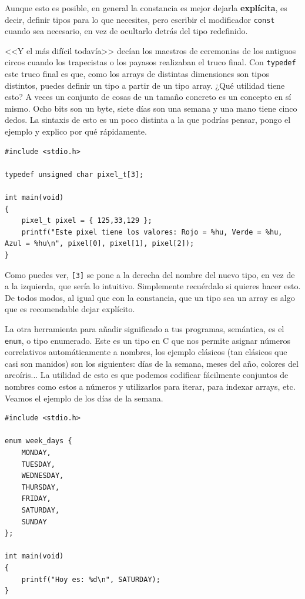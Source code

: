 \documentclass[a4paper]{article}
\begin{document}
Aunque esto es posible, en general la constancia es mejor dejarla
\textbf{explícita}, es decir, definir tipos para lo que necesites, pero
escribir el modificador \verb!const! cuando sea necesario, en vez de ocultarlo
detrás del tipo redefinido.

<<Y el más difícil todavía>> decían los maestros de ceremonias de los antiguos
circos cuando los trapecistas o los payasos realizaban el truco final. Con
\verb!typedef! este truco final es que, como los arrays de distintas dimensiones
son tipos distintos, puedes definir un tipo a partir de un tipo array. ¿Qué
utilidad tiene esto? A veces un conjunto de cosas de un tamaño concreto es un
concepto en sí mismo. Ocho bits son un byte, siete días son una
semana y una mano tiene cinco dedos. La sintaxis de esto es un poco distinta a
la que podrías pensar, pongo el ejemplo y explico por qué rápidamente.


\noindent
\begin{minipage}[H]{\linewidth}
\mbox{}
\begin{lstlisting}[style=C,
caption={Definición de un tipo personalizado a partir de un array},
label={lst:typedefArrayType}]
#include <stdio.h>

typedef unsigned char pixel_t[3];

int main(void)
{
    pixel_t pixel = { 125,33,129 };
    printf("Este pixel tiene los valores: Rojo = %hu, Verde = %hu, Azul = %hu\n", pixel[0], pixel[1], pixel[2]);
}
\end{lstlisting}
\end{minipage}

Como puedes ver, \verb![3]! se pone a la derecha del nombre del nuevo tipo, en
vez de a la izquierda, que sería lo intuitivo. Simplemente recuérdalo si quieres
hacer esto. De todos modos, al igual que con la constancia, que un tipo sea
un array es algo que es recomendable dejar explícito.

La otra herramienta para añadir significado a tus programas, semántica, es
el \verb!enum!, o tipo enumerado. Este es un tipo en C que nos permite asignar
números correlativos automáticamente a nombres, los ejemplo clásicos (tan
clásicos que casi son manidos) son los siguientes: días de la semana,
meses del año, colores del arcoíris... La utilidad de esto es que podemos
codificar fácilmente conjuntos de nombres como estos a números y utilizarlos
para iterar, para indexar arrays, etc. Veamos el ejemplo de los días de la
semana.


\noindent
\begin{minipage}[H]{\linewidth}
\mbox{}
\begin{lstlisting}[style=C,
caption={Ejemplo básico de tipo enumerado},
label={lst:BasicEnum}]
#include <stdio.h>

enum week_days {
    MONDAY,
    TUESDAY,
    WEDNESDAY,
    THURSDAY,
    FRIDAY,
    SATURDAY,
    SUNDAY
};

int main(void)
{
    printf("Hoy es: %d\n", SATURDAY);
}
\end{lstlisting}
\end{minipage}
\end{document}
